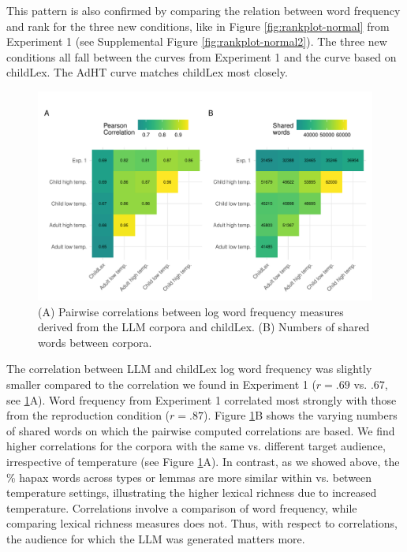 \documentclass[doc, a4paper]{apa7}
\begin{document}
This pattern is also confirmed by comparing the relation between word frequency and rank for the three new conditions, like in Figure \ref{fig:rankplot-normal} from Experiment 1 (see Supplemental Figure \ref{fig:rankplot-normal2}). The three new conditions all fall between the curves from Experiment 1 and the curve based on childLex. The AdHT curve matches childLex most closely. 

\begin{figure}[!htbp]
  \centerline{
    \includegraphics[width=1.1\textwidth]{figures/combined_plotc.pdf}}
    \caption{(A) Pairwise correlations between log word frequency measures derived from the LLM corpora and childLex. (B) Numbers of shared words between corpora.}
    \label{fig:combined_plotc}
\end{figure}

The correlation between LLM and childLex log word frequency was slightly smaller compared to the correlation we found in Experiment 1 ($r = .69$ vs. $.67$, see \ref{fig:combined_plotc}A). Word frequency from Experiment 1 correlated most strongly with those from the reproduction condition ($r = .87$). Figure \ref{fig:combined_plotc}B shows the varying numbers of shared words on which the pairwise computed correlations are based. We find higher correlations for the corpora with the same vs. different target audience, irrespective of temperature (see Figure \ref{fig:combined_plotc}A). In contrast, as we showed above, the \% hapax words across types or lemmas are more similar within vs. between temperature settings, illustrating the higher lexical richness due to increased temperature. Correlations involve a comparison of word frequency, while comparing lexical richness measures does not. Thus, with respect to correlations, the audience for which the LLM was generated matters more. 
\end{document}
